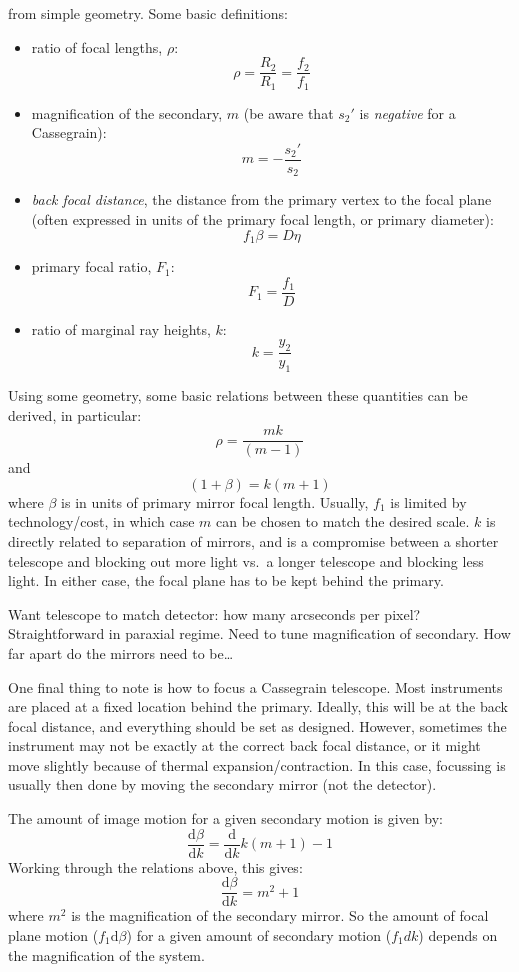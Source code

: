 \documentclass[12pt]{article}
\newcommand{\mynotes}[1]{\textcolor{myBlue}{#1}}
\begin{document}
from simple geometry. Some basic definitions:
\begin{itemize}
    \item ratio of focal lengths, $\rho$:
        \[
            \rho = \frac{R_{2}}{R_{1}} = \frac{f_{2}}{f_{1}}
            \]
    \item magnification of the secondary, $m$ (be aware that $s_{2}'$ is
        \emph{negative} for a Cassegrain):
        \[
            m = -\frac{s_{2}'}{s_{2}}
            \]
    \item \textit{back focal distance}, the distance from the primary vertex to
        the focal plane (often expressed in units of the primary focal length,
        or primary diameter):
        \[
            f_{1}\beta = D\eta
            \]
    \item primary focal ratio, $F_{1}$:
        \[
            F_{1} = \frac{f_{1}}{D}
            \]
    \item ratio of marginal ray heights, $k$:
        \[
            k = \frac{y_{2}}{y_{1}}
            \]
\end{itemize}
Using some geometry, some basic relations between these quantities
can be derived, in particular:
\[
    \rho = \frac{mk}{(m-1)}
    \]
and
\[
    (1+\beta) = k(m+1)
    \]
\mynotes{where $\beta$ is in units of primary mirror focal length.} Usually,
$f_{1}$ is limited by technology/cost, in which case $m$ can be chosen to match
the desired scale. $k$ is directly related to separation of mirrors, and is a
compromise between a shorter telescope and blocking out more light vs.\ a
longer telescope and blocking less light. In either case, the focal plane has
to be kept behind the primary.

\mynotes{%
Want telescope to match detector: how many arcseconds per pixel?
Straightforward in paraxial regime. Need to tune magnification of secondary.
How far apart do the mirrors need to be\ldots}

One final thing to note is how to focus a Cassegrain telescope. Most
instruments are placed at a fixed location behind the primary. Ideally, this
will be at the back focal distance, and everything should be set as designed.
However, sometimes the instrument may not be exactly at the correct back focal
distance, or it might move slightly because of thermal expansion/contraction.
In this case, focussing is usually then done by moving the secondary mirror
\mynotes{(not the detector)}.

The amount of image motion for a given secondary motion is given by:
\[
    \frac{\mathrm{d}\beta}{\mathrm{d}k}
    = \frac{\mathrm{d}}{\mathrm{d}k} k \left( m + 1 \right) - 1
    \]
Working through the relations above, this gives:
\[
    \frac{\mathrm{d}\beta}{\mathrm{d}k} = m^{2} + 1
    \]
where $m^{2}$ is the magnification of the secondary mirror.
So the amount of focal plane motion ($f_{1}\mathrm{d}\beta$)
for a given amount of secondary motion ($f_{1}dk$) depends on the
magnification of the system.
\end{document}
